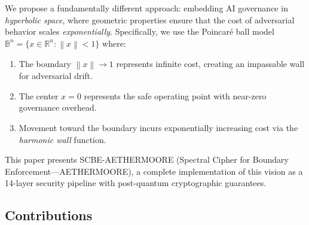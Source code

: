 \documentclass[11pt,a4paper]{article}
\newcommand{\BB}{\mathbb{B}}
\newcommand{\RR}{\mathbb{R}}
\newcommand{\norm}[1]{\left\|#1\right\|}
\begin{document}
We propose a fundamentally different approach: embedding AI governance
in \emph{hyperbolic space}, where geometric properties ensure that the
cost of adversarial behavior scales \emph{exponentially}. Specifically,
we use the Poincar\'{e} ball model $\BB^n = \{x \in \RR^n : \norm{x} < 1\}$
where:

\begin{enumerate}[label=(\roman*)]
  \item The boundary $\norm{x} \to 1$ represents infinite cost,
        creating an impassable wall for adversarial drift.
  \item The center $x = 0$ represents the safe operating point with
        near-zero governance overhead.
  \item Movement toward the boundary incurs exponentially increasing
        cost via the \emph{harmonic wall} function.
\end{enumerate}

This paper presents SCBE-AETHERMOORE (Spectral Cipher for Boundary
Enforcement---AETHERMOORE), a complete implementation of this vision
as a 14-layer security pipeline with post-quantum cryptographic
guarantees.

\subsection{Contributions}
\end{document}
